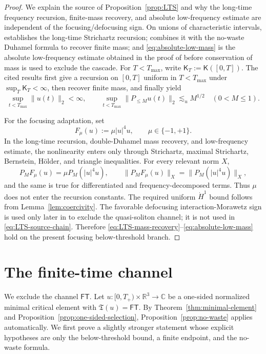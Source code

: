 \documentclass{interact}
\numberwithin{equation}{section}
\theoremstyle{plain}
\theoremstyle{definition}
\theoremstyle{remark}
\newcommand{\R}{\mathbb R}
\newcommand{\C}{\mathbb C}
\begin{document}
\begin{proof}
We explain the source of Proposition~\ref{prop:LTS} and why the long-time frequency recursion, finite-mass recovery, and absolute low-frequency estimate are independent of the focusing/defocusing sign. On unions of characteristic intervals, \cite[Theorem~4.1]{KillipVisan2012} establishes the long-time Strichartz recursion; \cite[Lemma~5.1]{KillipVisan2012} combines it with the no-waste Duhamel formula to recover finite mass; and \eqref{eq:absolute-low-mass} is the absolute low-frequency estimate obtained in the proof of \cite[Theorem~5.2]{KillipVisan2012} before conservation of mass is used to exclude the cascade. For $T<T_{\max}$, write $\mathsf K_T:=\mathsf K([0,T])$. The cited results first give a recursion on $[0,T]$ uniform in $T<T_{\max}$ under $\sup_T\mathsf K_T<\infty$, then recover finite mass, and finally yield
\begin{equation}\label{eq:LTS-source-chain}
 \sup_{t<T_{\max}}\|u(t)\|_2<\infty,
 \qquad
 \sup_{t<T_{\max}}\|P_{\le M}u(t)\|_2\lesssim_u M^{1/2}
 \quad(0<M\le1).
\end{equation}

For the focusing adaptation, set
\[
 F_\mu(u):=\mu|u|^4u,
 \qquad \mu\in\{-1,+1\}.
\]
In the long-time recursion, double-Duhamel mass recovery, and low-frequency estimate, the nonlinearity enters only through Strichartz, maximal Strichartz, Bernstein, H\"older, and triangle inequalities. For every relevant norm $X$,
\[
 P_MF_\mu(u)=\mu P_M(|u|^4u),
 \qquad
 \|P_MF_\mu(u)\|_X
 =\|P_M(|u|^4u)\|_X,
\]
and the same is true for differentiated and frequency-decomposed terms. Thus $\mu$ does not enter the recursion constants. The required uniform $\dot H^1$ bound follows from Lemma~\ref{lem:coercivity}. The favorable defocusing interaction-Morawetz sign is used only later in \cite{KillipVisan2012} to exclude the quasi-soliton channel; it is not used in \eqref{eq:LTS-source-chain}. Therefore \eqref{eq:LTS-mass-recovery}--\eqref{eq:absolute-low-mass} hold on the present focusing below-threshold branch.
\end{proof}

\section{The finite-time channel}

We exclude the channel $\mathsf{FT}$. Let $u:[0,T_+)\times\R^3\to\C$ be a one-sided normalized minimal critical element with $\mathfrak T(u)=\mathsf{FT}$. By Theorem~\ref{thm:minimal-element} and Proposition~\ref{prop:one-sided-selection}, Proposition~\ref{prop:no-waste} applies automatically. We first prove a slightly stronger statement whose explicit hypotheses are only the below-threshold bound, a finite endpoint, and the no-waste formula.
\end{document}

